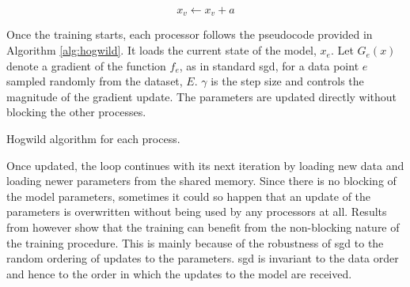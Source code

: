 $$
x_{v} \leftarrow x_{v}+a
$$

Once the training starts, each processor follows the pseudocode provided in Algorithm \ref{alg:hogwild}. It loads the current state of the model, $x_e$. Let $G_{e}(x)$ denote a gradient of the function $f_{e}$, as in standard \acrshort{sgd}, for a data point $e$ sampled randomly from the dataset, $E$. $\gamma$ is the step size and controls the magnitude of the gradient update. The parameters are updated directly without blocking the other processes.


\begin{algorithm}
\caption{Hogwild algorithm for each process.}\label{alg:hogwild}
\end{algorithm}

Once updated, the loop continues with its next iteration by loading new data and loading newer parameters from the shared memory. Since there is no blocking of the model parameters, sometimes  it could so happen that an update of the parameters is overwritten without being used by any processors at all. Results from \cite{Niu2011HOGWILD:Descent} however show that the training can benefit from the non-blocking nature of the training procedure. This is mainly because of the robustness of \acrshort{sgd} to the random ordering of updates to the parameters. \acrshort{sgd} is invariant to the data order and hence to the order in which the updates to the model are received.

